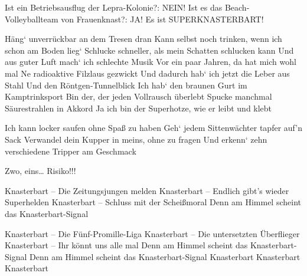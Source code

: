     \beginverse*\replay[bridge]
        Ist ein Betriebsausflug der Lepra-Kolonie?: NEIN!
        Ist es das Beach-Volleyballteam von Frauenknast?: JA!
        Es ist SUPERKNASTERBART!
    \endverse

    \beginverse\memorize[interlude1]
        Häng‘ unverrückbar an dem Tresen dran
        Kann selbst noch trinken, wenn ich schon am Boden lieg‘
        Schlucke schneller, als mein Schatten schlucken kann
        Und aus guter Luft mach‘ ich schlechte Musik
        Vor ein paar Jahren, da hat mich wohl mal
        Ne radioaktive Filzlaus gezwickt
        Und dadurch hab‘ ich jetzt die Leber aus Stahl
        Und den Röntgen-Tunnelblick
        Ich hab‘ den braunen Gurt im Kamptrinksport
        Bin der, der jeden Vollrausch überlebt
        Spucke manchmal Säurestrahlen in Akkord
        Ja ich bin der Superhotze, wie er leibt und klebt
    \endverse

    \beginverse\memorize[interlude2]
        Ich kann locker saufen ohne Spaß zu haben
        Geh‘ jedem Sittenwächter tapfer auf'n Sack
        Verwandel dein Kupper in meins, ohne zu fragen
        Und erkenn‘ zehn verschiedene Tripper am Geschmack
    \endverse

    \beginchorus\replay[chorus]
        Zwo, eins… Risiko!!!

        Knasterbart – Die Zeitungsjungen melden
        Knasterbart – Endlich gibt's wieder Superhelden
        Knasterbart – Schluss mit der Scheißmoral
        Denn am Himmel scheint das Knasterbart-Signal
    \endchorus

    \beginchorus\replay[chorus]
        Knasterbart – Die Fünf-Promille-Liga
        Knasterbart – Die untersetzten Überflieger
        Knasterbart – Ihr könnt uns alle mal
        Denn am Himmel scheint das Knasterbart-Signal
        Denn am Himmel scheint das Knasterbart-Signal
        Knasterbart
        Knasterbart
        Knasterbart
    \endchorus
\endsong
